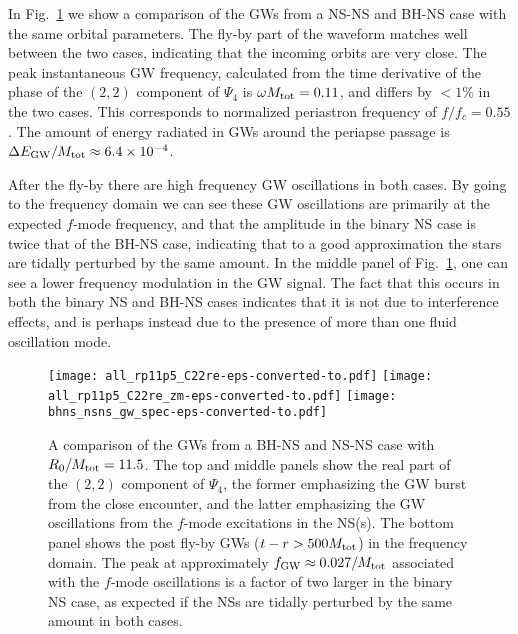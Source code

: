 \documentclass[prd,aps,floatfix,superscriptaddress,nofootinbib,twocolumn,10pt,English]{revtex4}
\begin{document}
In Fig.~\ref{fig:bhns_nsns_gw} we show a comparison of the GWs from a
NS-NS and BH-NS case with the same orbital parameters. The fly-by part
of the waveform matches well between the two cases, indicating that the
incoming orbits are very close.  The peak instantaneous GW frequency,
calculated from the time derivative of the phase of the $(2,2)$
component of $\Psi_4$ is $\omega M_{\rm tot}=0.11$, and differs by
$<1\%$ in the two cases.  This corresponds to normalized periastron
frequency of $f/f_c=0.55$. The amount
of energy radiated in GWs around the periapse passage is $\Delta
E_{\rm GW}/M_{\rm tot}\approx 6.4\times10^{-4}$.

After the fly-by there are high frequency GW oscillations in both cases. By
going to the frequency domain we can see these GW oscillations are primarily at
the expected $f$-mode frequency, and that the amplitude in the binary NS case
is twice that of the BH-NS case, indicating that to a good approximation the
stars are tidally perturbed by the same amount. In the middle panel of
Fig.~\ref{fig:bhns_nsns_gw}, one can see a lower frequency modulation in the GW
signal.  The fact that this occurs in both the binary NS and BH-NS cases
indicates that it is not due to interference effects, and is perhaps instead
due to the presence of more than one fluid oscillation mode.

\begin{figure}
    \begin{center}
        \texttt{[image: all\_rp11p5\_C22re-eps-converted-to.pdf]}
        \texttt{[image: all\_rp11p5\_C22re\_zm-eps-converted-to.pdf]}
        \texttt{[image: bhns\_nsns\_gw\_spec-eps-converted-to.pdf]}
    \end{center}
    \caption{ A comparison of the GWs from a BH-NS and NS-NS case with
      $R_0/M_{\rm tot}=11.5$.  The top and middle panels show the real
      part of the $(2,2)$ component of $\Psi_4$, the former
      emphasizing the GW burst from the close encounter, and the
      latter emphasizing the GW oscillations from the $f$-mode
      excitations in the NS(s). The bottom panel shows the post fly-by
      GWs ($t-r>500M_{\rm tot}$) in the frequency domain. The peak at
      approximately $f_{\rm GW} \approx0.027/M_{\rm tot}$ associated with the
      $f$-mode oscillations is a factor of two larger in the binary NS
      case, as expected if the NSs are tidally perturbed by the same
      amount in both cases.
        \label{fig:bhns_nsns_gw}
    }
\end{figure}
\end{document}
